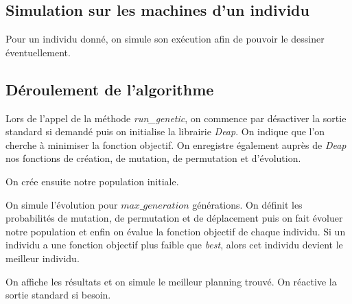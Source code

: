 \subsection{Simulation sur les machines d'un individu}



Pour un individu donné, on simule son exécution afin de pouvoir le dessiner éventuellement.

\newpage

\subsection{Déroulement de l'algorithme}



Lors de l'appel de la méthode \textit{run\_genetic}, on commence par désactiver la sortie standard si demandé puis on initialise la librairie \textit{Deap}. On indique que l'on cherche à minimiser la fonction objectif. On enregistre également auprès de \textit{Deap} nos fonctions de création, de mutation, de permutation et d'évolution.



On crée ensuite notre population initiale.



On simule l'évolution pour $max\_generation$ générations. On définit les probabilités de mutation, de permutation et de déplacement puis on fait évoluer notre population et enfin on évalue la fonction objectif de chaque individu. Si un individu a une fonction objectif plus faible que \textit{best}, alors cet individu devient le meilleur individu. 



On affiche les résultats et on simule le meilleur planning trouvé. On réactive la sortie standard si besoin.